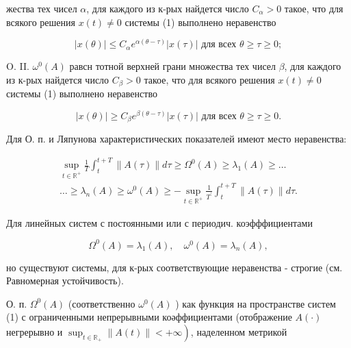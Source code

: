 \documentclass[10pt]{article}
\begin{document}
жества тех чисел $\alpha$, для каждого из к-рых найдется число $C_{\alpha}>0$ такое, что для всякого решения $x(t) \neq 0$ системы (1) выполнено неравенство



\[

|x(\theta)| \leqslant C_{\alpha} e^{\alpha(\theta-\tau)}|x(\tau)| \text { для всех } \theta \geqslant \tau \geqslant 0 ;

\]



O. II. $\omega^{0}(A)$ равсн тотной верхней грани множества тех чисел $\beta$, для каждого из к-рых найдется число $C_{\beta}>0$ такое, что для всякого решения $x(t) \neq 0$ системы (1) выполнено неравенство



\[

|x(\theta)| \geqslant C_{\beta} e^{\beta(\theta-\tau)}|x(\tau)| \text { для всех } \theta \geqslant \tau \geqslant 0 .

\]



Для О. п. и Ляпунова характеристических показателей имеют место неравенства:



\[

\begin{gathered}

\sup _{t \in \mathbb{R}^{+}} \frac{1}{T} \int_{t}^{t+T}\|A(\tau)\| d \tau \geqslant \Omega^{0}(A) \geqslant \lambda_{1}(A) \geqslant \ldots \\

\ldots \geqslant \lambda_{n}(A) \geqslant \omega^{0}(A) \geqslant-\sup _{t \in \mathbb{R}^{+}} \frac{1}{T^{\prime}} \int_{t}^{t+T}\|A(\tau)\| d \tau .

\end{gathered}

\]



Для линейных систем с постоянными или с периодич. коэфффициентами



\[

\Omega^{0}(A)=\lambda_{1}(A), \quad \omega^{0}(A)=\lambda_{n}(A),

\]



но существуют системы, для к-рых соответствующие неравенства - строгие (см. Равномерная устойчивость).



О. п. $\Omega^{0}(A)$ (соответственно $\omega^{0}(A)$ ) как функция на пространстве систем (1) с ограниченными непрерывными коәффициентами (отображение $A(\cdot)$ негрерывно и $\left.\sup _{t \in \mathbb{R}_{+}}\|A(t)\|<+\infty\right)$, наделенном метрикой
\end{document}
